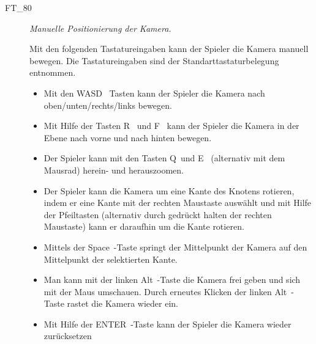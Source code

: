 \begin{description}
		\item[FT\_80] \textit{Manuelle Positionierung der Kamera.} \hfill\\
	
	\label{FT:80}
	
	Mit den folgenden Tastatureingaben kann der Spieler die Kamera manuell bewegen. Die Tastatureingaben sind der Standarttastaturbelegung entnommen.
	
			\begin{itemize} 
        \item Mit den \glqq WASD\grqq~ Tasten kann der Spieler die Kamera nach oben/unten/rechts/links bewegen.
        \item Mit Hilfe der Tasten \glqq R\grqq~ und \glqq F\grqq~ kann der Spieler die Kamera in der Ebene nach vorne und nach hinten bewegen.
        \item Der Spieler kann mit den Tasten \glqq Q\grqq~und \glqq E\grqq~ (alternativ mit dem Mausrad) herein- und herauszoomen.
        \item Der Spieler kann die Kamera um eine Kante des Knotens rotieren, indem er eine Kante mit der rechten Maustaste auswählt und mit Hilfe der Pfeiltasten (alternativ durch gedrückt halten der rechten Maustaste) kann er daraufhin um die Kante rotieren.
        \item Mittels der \glqq Space\grqq~-Taste springt der Mittelpunkt der Kamera auf den Mittelpunkt der selektierten Kante.
        \item Man kann mit der linken \glqq Alt\grqq~-Taste die Kamera frei geben und sich mit der Maus umschauen. Durch erneutes Klicken der linken \glqq Alt\grqq~-Taste rastet die Kamera wieder ein.
        \item Mit Hilfe der \glqq ENTER\grqq~-Taste kann der Spieler die Kamera wieder zurücksetzen
		
		\end{itemize}
	
\end{description}









